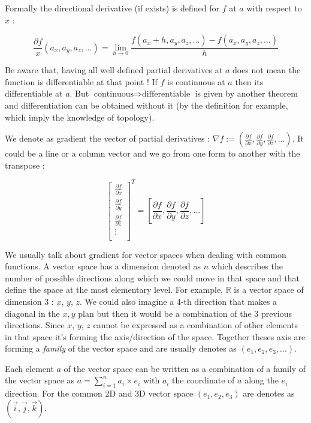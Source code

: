 \documentclass[12pt]{article}
\begin{document}
Formally the directional derivative (if exists) is defined for $f$ at $a$ with respect to $x$ :

$$
\frac{\partial{f}}{x}(a_x, a_y, a_z, ...) = \lim_{ h \to 0} \frac{f(a_x+h, a_y, a_z, ...)-f(a_x, a_y, a_z, ...)}{h}
$$

Be aware that, having all well defined partial derivatives at $a$ does not mean the function is differentiable at that point ! If $f$ is continuous at $a$ then its differentiable at $a$. But $\text{continuous} \Rightarrow \text{differentiable}$ is given by another theorem and differentiation can be obtained without it (by the definition \cite{wiki_differentiable_function} for example, which imply the knowledge of topology).

We denote as gradient \cite{wiki_gradient} the vector of partial derivatives : $ \nabla f := (\frac{\partial{f}}{\partial{x}}, \frac{\partial{f}}{\partial{y}}, \frac{\partial{f}}{\partial{z}},...)$. It could be a line or a column vector and we go from one form to another with the transpose \cite{wiki_transpose} : 

$$
\begin{bmatrix}
    \frac{\partial{f}}{\partial{x}} \\
    \frac{\partial{f}}{\partial{y}} \\
    \frac{\partial{f}}{\partial{z}} \\
    \vdots \\
\end{bmatrix}^T = [\frac{\partial{f}}{\partial{x}}, \frac{\partial{f}}{\partial{y}}, \frac{\partial{f}}{\partial{z}},...]
$$

We usually talk about gradient for vector spaces \cite{wiki_vector_space} when dealing with common functions. A vector space has a dimension denoted as $n$ which describes the number of possible directions along which we could move in that space and that define the space at the most elementary level. For example, $\mathbb{R}$ is a vector space of dimension 3 : $x$, $y$, $z$. We could also imagine a 4-th direction that makes a diagonal in the $x,y$ plan but then it would be a combination of the 3 previous directions. Since $x$, $y$, $z$ cannot be expressed as a combination of other elements in that space it's forming the axis/direction of the space. Together theses axis are forming a {\it family} of the vector space and are usually denotes as $(e_1, e_2, e_3, ...)$. 

Each element $a$ of the vector space can be written as a combination of a family of the vector space as $a = \sum_{i=1}^{n} a_i \times e_i$ with $a_i$ the coordinate of $a$ along the $e_i$ direction. For the common 2D and 3D vector space $(e_1, e_2, e_3)$ are denotes as $(\vec{i}, \vec{j}, \vec{k})$.
\end{document}
